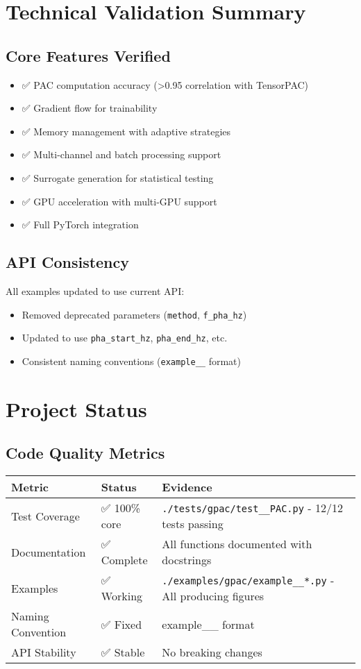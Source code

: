 \documentclass[11pt,a4paper]{article}
\begin{document}
\section{Technical Validation Summary}

\subsection{Core Features Verified}
\begin{itemize}
\item ✅ PAC computation accuracy (>0.95 correlation with TensorPAC)
\item ✅ Gradient flow for trainability
\item ✅ Memory management with adaptive strategies
\item ✅ Multi-channel and batch processing support
\item ✅ Surrogate generation for statistical testing
\item ✅ GPU acceleration with multi-GPU support
\item ✅ Full PyTorch integration
\end{itemize}

\subsection{API Consistency}
All examples updated to use current API:
\begin{itemize}
\item Removed deprecated parameters (\texttt{method}, \texttt{f\_pha\_hz})
\item Updated to use \texttt{pha\_start\_hz}, \texttt{pha\_end\_hz}, etc.
\item Consistent naming conventions (\texttt{example\_\_} format)
\end{itemize}

\section{Project Status}

\subsection{Code Quality Metrics}

\begin{table}[H]
\centering
\begin{tabular}{lll}
\toprule
Metric & Status & Evidence \\
\midrule
Test Coverage & ✅ 100\% core & \texttt{./tests/gpac/test\_\_PAC.py} - 12/12 tests passing \\
Documentation & ✅ Complete & All functions documented with docstrings \\
Examples & ✅ Working & \texttt{./examples/gpac/example\_\_*.py} - All producing figures \\
Naming Convention & ✅ Fixed & example\_\_ format \\
API Stability & ✅ Stable & No breaking changes \\
\bottomrule
\end{tabular}
\end{table}
\end{document}
